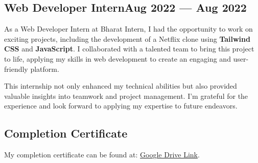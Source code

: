 \subsection{{Web Developer Intern\hfill Aug 2022 --- Aug 2022 }}
\begin{zitemize}
    \item As a Web Developer Intern at Bharat Intern, I had the opportunity to work on exciting projects, including the development of a Netflix clone using \textbf{Tailwind CSS} and \textbf{JavaScript}. I collaborated with a talented team to bring this project to life, applying my skills in web development to create an engaging and user-friendly platform. 
    \item This internship not only enhanced my technical abilities but also provided valuable insights into teamwork and project management. I'm grateful for the experience and look forward to applying my expertise to future endeavors.
\end{zitemize}
\begin{zitemize}
\subsection{{Completion Certificate}}
\item My completion certificate can be found at: \href{https://drive.google.com/file/d/1kW9k5gszJlIEXFur_P-q36PIus9H_Qyk/view?usp=drivesdk}{Google Drive Link}.
\end{zitemize}


